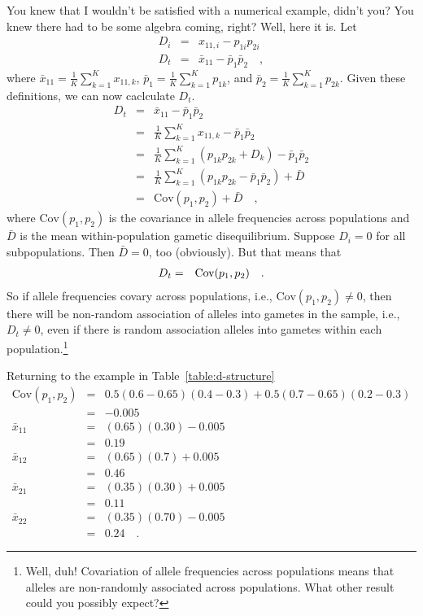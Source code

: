 You knew that I wouldn't be satisfied with a numerical example, didn't
you? You knew there had to be some algebra coming, right? Well, here
it is. Let
\begin{eqnarray*}
D_i &=& x_{11,i} - p_{1i}p_{2i} \\
D_t &=& \bar x_{11} - \bar p_1\bar p_2 \quad ,
\end{eqnarray*}
where $\bar x_{11} = \frac{1}{K} \sum_{k=1}^K x_{11,k}$, $\bar p_1 =
\frac{1}{K} \sum_{k=1}^K p_{1k}$, and $\bar p_2 = \frac{1}{K}
\sum_{k=1}^K p_{2k}$. Given these definitions, we can now caclculate
$D_t$. 
\begin{eqnarray*}
D_t &=& \bar x_{11} - \bar p_1\bar p_2 \\
    &=& \frac{1}{K} \sum_{k=1}^K x_{11,k} - \bar p_1\bar p_2 \\
    &=& \frac{1}{K} \sum_{k=1}^K (p_{1k}p_{2k} + D_k) - \bar p_1\bar p_2 \\
    &=& \frac{1}{K} \sum_{k=1}^K (p_{1k}p_{2k} - \bar p_1\bar p_2) + \bar D \\
    &=& \mbox{Cov}(p_1, p_2) + \bar D \quad ,
\end{eqnarray*}
where $\mbox{Cov}(p_1, p_2)$ is the covariance in allele frequencies
across populations and $\bar D$ is the mean within-population gametic
disequilibrium. Suppose $D_i = 0$ for all subpopulations. Then $\bar D
= 0$, too (obviously). But that means that
\begin{eqnarray*}
D_t &=& \hbox{Cov}(p_1, p_2) \quad .
\end{eqnarray*}
So if allele frequencies covary across populations, i.e.,
$\mbox{Cov}(p_1, p_2) \ne 0$, then there will be non-random
association of alleles into gametes in the sample, i.e., $D_t \ne 0$,
even if there is random association alleles into gametes within each
population.\footnote{Well, duh! Covariation of allele frequencies
  across populations means that alleles are non-randomly associated
  across populations. What other result could you possibly expect?}

Returning to the example in Table~\ref{table:d-structure}
\begin{eqnarray*}
\mbox{Cov}(p_1, p_2) &=& 0.5(0.6-0.65)(0.4-0.3) + 0.5(0.7-0.65)(0.2-0.3) \\
                     &=& -0.005 \\
\bar x_{11}          &=& (0.65)(0.30) - 0.005 \\
                     &=& 0.19 \\
\bar x_{12}          &=& (0.65)(0.7) + 0.005 \\
                     &=& 0.46 \\
\bar x_{21}          &=& (0.35)(0.30) + 0.005 \\
                     &=& 0.11 \\
\bar x_{22}          &=& (0.35)(0.70) - 0.005 \\
                     &=& 0.24 \quad .
\end{eqnarray*}

